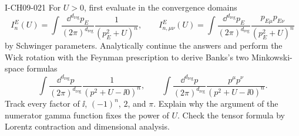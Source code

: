 \begin{exercise}{I-CH09-021}
For $U>0$, first evaluate in the convergence domains
\[
  I_n^E(U)=\int\frac{\dd^{d_{\mathrm{reg}}}p_E}{(2\pi)^{d_{\mathrm{reg}}}}
  \frac{1}{(p_E^2+U)^n},
  \qquad
  I_{n,\mu\nu}^E(U)=\int\frac{\dd^{d_{\mathrm{reg}}}p_E}{(2\pi)^{d_{\mathrm{reg}}}}
  \frac{p_{E\mu}p_{E\nu}}{(p_E^2+U)^n}
\]
by Schwinger parameters.  Analytically continue the answers and perform the
Wick rotation with the Feynman prescription to derive Banks's two
Minkowski-space formulas
\[
  \int\frac{\dd^{d_{\mathrm{reg}}}p}{(2\pi)^{d_{\mathrm{reg}}}}
  \frac{1}{(p^2+U-\ii0)^n},
  \qquad
  \int\frac{\dd^{d_{\mathrm{reg}}}p}{(2\pi)^{d_{\mathrm{reg}}}}
  \frac{p^\mu p^\nu}{(p^2+U-\ii0)^n}.
\]
Track every factor of $\ii$, $(-1)^n$, $2$, and $\pi$.  Explain why the
argument of the numerator gamma function fixes the power of $U$.  Check the
tensor formula by Lorentz contraction and dimensional analysis.
\end{exercise}
